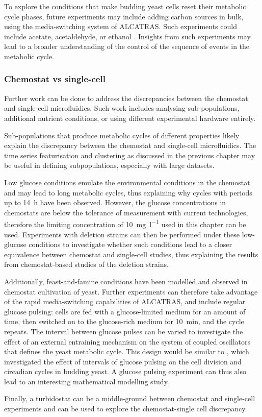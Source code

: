To explore the conditions that make budding yeast cells reset their metabolic cycle phases, future experiments may include adding carbon sources in bulk, using the media-switching system of ALCATRAS.
Such experiments could include acetate, acetaldehyde, or ethanol \parencite{kuangMsn2RegulateExpression2017, krishnaMinimalPushPull2018}.
Insights from such experiments may lead to a broader understanding of the control of the sequence of events in the metabolic cycle.


\subsubsection{Chemostat vs single-cell}
\label{subsec:biology-discussion-caveats-chemostat}

Further work can be done to address the discrepancies between the chemostat and single-cell microfluidics.
Such work includes analysing sub-populations, additional nutrient conditions, or using different experimental hardware entirely.

Sub-populations that produce metabolic cycles of different properties likely explain the discrepancy between the chemostat and single-cell microfluidics.
The time series featurisation and clustering as discussed in the previous chapter may be useful in defining subpopulations, especially with large datasets.

Low glucose conditions emulate the environmental conditions in the chemostat and may lead to long metabolic cycles, thus explaining why cycles with periods up to \SI{14}{\hour} have been observed.
However, the glucose concentrations in chemostats are below the tolerance of measurement with current technologies, therefore the limiting concentration of \SI{10}{\milli\gram~\litre^{-1}} used in this chapter can be used.
Experiments with deletion strains can then be performed under these low-glucose conditions to investigate whether such conditions lead to a closer equivalence between chemostat and single-cell studies, thus explaining the results from chemostat-based studies of the deletion strains.

Additionally, feast-and-famine conditions have been modelled \parencite{jonesCyberneticModelGrowth1999} and observed \parencite{oneillEukaryoticCellBiology2020} in chemostat cultivation of yeast.
Further experiments can therefore take advantage of the rapid media-switching capabilities of ALCATRAS, and include regular glucose pulsing: cells are fed with a glucose-limited medium for an amount of time, then switched on to the glucose-rich medium for \SI{10}{\minute}, and the cycle repeats.
The interval between glucose pulses can be varied to investigate the effect of an external entraining mechanism on the system of coupled oscillators that defines the yeast metabolic cycle.
This design would be similar to \textcite{charvinForcedPeriodicExpression2009}, which investigated the effect of intervals of glucose pulsing on the cell division and circadian cycles in budding yeast.
A glucose pulsing experiment can thus also lead to an interesting mathematical modelling study.

Finally, a turbidostat can be a middle-ground between chemostat and single-cell experiments and can be used to explore the chemostat-single cell discrepancy.
